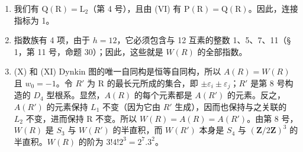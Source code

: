 \begin{enumerate}
\def\labelenumi{(\Roman{enumi})}
\setcounter{enumi}{7}
\item
  我们有 \(\mathrm{Q}(\mathrm{R}) = \mathrm{L}_2\)（第 4 号），且由 (VI) 有 \(\mathrm{P}(\mathrm{R}) = \mathrm{Q}(\mathrm{R})\)。因此，连接指标为 1。
\item
  指数族有 4 项，由于 \(h = 12\)，它必须包含与 12 互素的整数 1、5、7、11（§ 1，第 11 号，命题 30）；因此，这些就是 \(W(R)\) 的全部指数。
\item
  (X) 和 (XI) Dynkin 图的唯一自同构是恒等自同构，所以 \(A(R) = W(R)\) 且 \(w_{0} = -1\)。令 \(R'\) 为 R 的最长元所成的集合，即 \(\pm\varepsilon_{i} \pm \varepsilon_{j}\)；\(R'\) 是第 8 号构造的 \(D_{4}\) 型根系。显然，\(A(R)\) 的每个元素都是 \(A(R')\) 的元素。反之，\(A(R')\) 的元素保持 \(L_{1}\) 不变（因为它由 \(R'\) 生成），因而也保持与之关联的 \(L_{2}\) 不变，进而保持 R 不变。所以 \(W(R) = A(R) = A(R')\)。由第 8 号，\(W(R)\) 是 \(S_{3}\) 与 \(W(R')\) 的半直积，而 \(W(R')\) 本身是 \(S_{4}\) 与 \((\mathbf{Z}/2\mathbf{Z})^{3}\) 的半直积。\(W(R)\) 的阶为 \(3!4!2^{3} = 2^{7}.3^{2}\)。
\end{enumerate}

